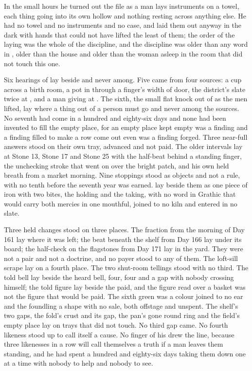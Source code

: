 \scenebreak

In the small hours he turned out the file as a man lays instruments on a towel, each thing going into its own hollow and nothing resting across anything else. He had no towel and no instruments and no case, and laid them out anyway in the dark with hands that could not have lifted the least of them; the order of the laying was the whole of the discipline, and the discipline was older than any word in , older than the house and older than the woman asleep in the room that did not touch this one.

Six hearings of  lay beside and never among. Five came from four sources: a cup across a birth room, a pot in  through a finger's width of door, the district's slate twice at , and a man giving at . The sixth, the small flat knock out of  as the men lifted, lay where a thing out of a person must go and never among the sources. No seventh had come in a hundred and eighty-six days and none had been invented to fill the empty place, for an empty place kept empty was a finding and a finding filled to make a row come out even was a finding forged. Three near-full answers stood on their own tray, advanced and not paid. The older intervals lay at Stone 13, Stone 17 and Stone 25 with the half-beat behind a standing finger, the unchecking stroke that went on over the bright patch, and his own held breath from a market morning. Nine stoppings stood as objects and not a rule, with no tenth before the seventh year was earned.  lay beside them as one piece of iron with two bites, the holding and the taking, with no word in Grathic that would carry both mercies in one mouthful, joined to no kiln and entered in no slate.

Three held changes stood on three places. The fraction from the morning of Day 161 lay where it was left; the beat beneath the shelf from Day 166 lay under its board; the half-check on the flagstones from Day 171 lay in the yard. They were not a pair and not a doctrine, and no payer stood to any of them. The loft-sill scrape lay on a fourth place. The two shut-room tellings stood with no third. The told bell lay beside the heard bell, four, four and a gap with nobody crossing himself; the told figure lay beside the paid, and the figure read over a basket was not the figure that would be paid. The sixth green was a colour joined to no ear and the foundling a shape with no sale, both offstage and unspent. The shelf's two gaps, the fold's crust and its gap, the pan's gone round ring and the field's empty place lay on trays that did not touch. No third gap came. No fourth likeness stood up to call itself a cause. No finger of his drew the line, because three likenesses in a row will call themselves a truth if a man leaves them standing, and he had spent a hundred and eighty-six days taking them down one at a time with nobody to help and nobody to see.

